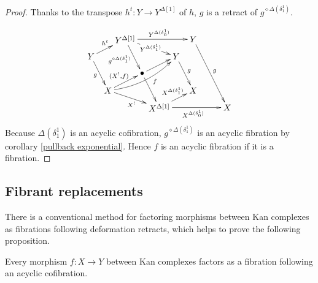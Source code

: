 \documentclass{tac}
\newcommand\hide[1]{}
\newcommand\bang{!}
\newcommand\of{:}
\newcommand\simplex\Delta
\newcommand\pe[1]{^{\diamond #1}}
\begin{document}
\begin{proof}
Thanks to the transpose $h^t\of Y\to Y^{\simplex[1]}$ of $h$, $g$ is a retract of $g\pe{\simplex(\delta^1_1)}$.
\hide{\[\xymatrix{
Y\ar[d]_g \ar[r]^{h^t} & Y^{\simplex[1]} \ar[d]_{g\pe{\simplex(\delta^1_1)}} \ar[dr]^{Y^{\simplex(\delta^1_1)}} \ar[rr]^{Y^{\simplex(\delta^1_0)}}&& Y \ar[d]^g\\
X \ar[r]^{(X^\bang,f)} \ar[dr]_{X^\bang} \ar@/_3ex/[rr]_(.6)f & \bullet\ar[r]\ar[d] & Y \ar[d]_(.4)g & X \\
& X^{\simplex[1]} \ar[r]_{X^{\simplex(\delta_1^1)}} \ar@/_2ex/[urr]_(.7){X^{\simplex(\delta^1_0)}}& X
}\]}
\[\xy
(0,21)*+{Y}="Y0",(14,28)*+{Y^{\simplex[1]}}="Y1",(35,21)*+{Y}="Y2",(42,28)*+{Y}="Y3",
(21,14)*+{\bullet}="center",
(7,7)*+{X}="X0",(28,0)*+{X^{\simplex[1]}}="X1",(42,7)*+{X}="X2",(56,0)*+{X}="X3"
\ar_g "Y0";"X0" \ar^{h^t} "Y0";"Y1"
\ar_{g\pe{\simplex(\delta^1_1)}} "Y1";"center" \ar|{Y^{\simplex(\delta^1_1)}} "Y1";"Y2" \ar^{Y^{\simplex(\delta^1_0)}} "Y1";"Y3"
\ar^g "Y2";"X2"\ar^g "Y3";"X3"
\ar "center";"X1" \ar "center";"Y2"
\ar^{(X^\bang,f)} "X0";"center" \ar_{X^\bang} "X0";"X1" \ar@/_2ex/_(.6)f "X0";"Y2"
\ar^(.6){X^{\simplex(\delta_1^1)}} "X1";"X2" \ar_{X^{\simplex(\delta_0^1)}} "X1";"X3"
\endxy\]
Because $\simplex(\delta^1_1)$ is an acyclic cofibration, $g\pe{\simplex(\delta^1_1)}$ is an acyclic fibration by corollary \ref{pullback exponential}. Hence $f$ is an acyclic fibration if it is a fibration.
\end{proof}

\subsection{Fibrant replacements}
There is a conventional method for factoring morphisms between Kan complexes as fibrations following deformation retracts, which helps to prove the following proposition.

\begin{proposition} Every morphism $f\of X\to Y$ between Kan complexes factors as a fibration following an acyclic cofibration. \label{factor2} \end{proposition}
\end{document}
